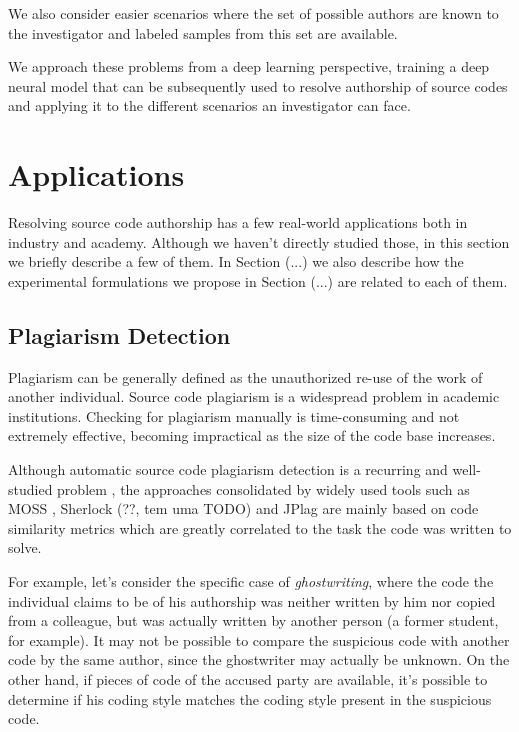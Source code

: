 We also consider easier scenarios where the set of possible authors are known to the investigator and labeled samples from this set are available. %

We approach these problems from a deep learning perspective, training a deep neural model that can be subsequently used to resolve authorship of source codes and applying it to the different scenarios an investigator can face.

\section{Applications}

Resolving source code authorship has a few real-world applications both in industry and academy. Although we haven't directly studied those, in this section we briefly describe a few of them. In Section (...) we also describe how the experimental formulations we propose in Section (...) are related to each of them.

\subsection{Plagiarism Detection}

Plagiarism can be generally defined as the unauthorized re-use of the work of another individual. Source code plagiarism is a widespread problem in academic institutions. Checking for plagiarism manually is time-consuming and not extremely effective, becoming impractical as the size of the code base increases.

Although automatic source code plagiarism detection is a recurring and well-studied problem \cite{plag_survey}, the approaches consolidated by widely used tools such as MOSS \cite{moss}, Sherlock (??, tem uma TODO) and JPlag \cite{jplag} are mainly based on code similarity metrics which are greatly correlated to the task the code was written to solve.%

For example, let's consider the specific case of \textit{ghostwriting}, where the code the individual claims to be of his authorship was neither written by him nor copied from a colleague, but was actually written by another person (a former student, for example).  It may not be possible to compare the suspicious code with another code by the same author, since the ghostwriter may actually be unknown. On the other hand, if pieces of code of the accused party are available, it's possible to determine if his coding style matches the coding style present in the suspicious code.


